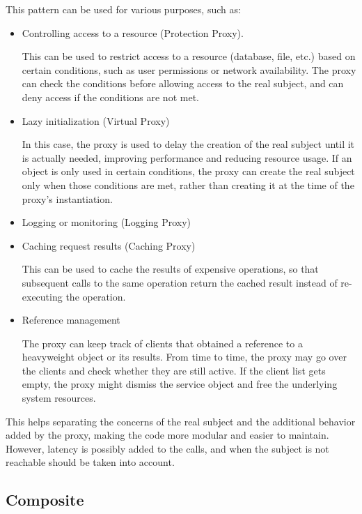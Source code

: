 This pattern can be used for various purposes, such as:
\begin{itemize}
    \item Controlling access to a resource (Protection Proxy).
    
    This can be used to restrict access to a resource (database, file, etc.) based on certain conditions, such as user permissions or network availability. The proxy can check the conditions before allowing access to the real subject, and can deny access if the conditions are not met.
    \item Lazy initialization (Virtual Proxy)
    
    In this case, the proxy is used to delay the creation of the real subject until it is actually needed, improving performance and reducing resource usage. If an object is only used in certain conditions, the proxy can create the real subject only when those conditions are met, rather than creating it at the time of the proxy's instantiation.

    \item Logging or monitoring (Logging Proxy)
    
    \item Caching request results (Caching Proxy)
    
    This can be used to cache the results of expensive operations, so that subsequent calls to the same operation return the cached result instead of re-executing the operation.

    \item Reference management
    
    The proxy can keep track of clients that obtained a reference to a heavyweight object or its results. From time to time, the proxy may go over the clients and check whether they are still active. If the client list gets empty, the proxy might dismiss the service object and free the underlying system resources.
\end{itemize}

This helps separating the concerns of the real subject and the additional behavior added by the proxy, making the code more modular and easier to maintain. However, latency is possibly added to the calls, and when the subject is not reachable should be taken into account.



\subsection{Composite}

